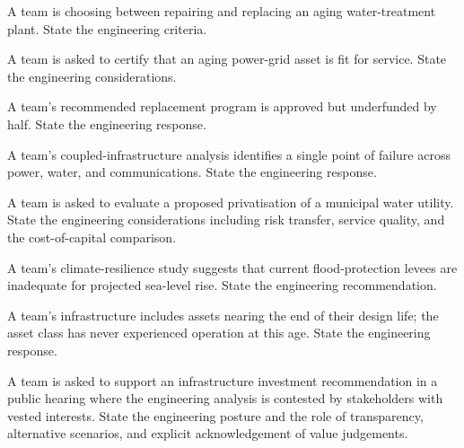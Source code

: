 \begin{exercise}
A team is choosing between repairing and replacing an aging water-treatment plant. State the engineering criteria.
\end{exercise}

\begin{exercise}
A team is asked to certify that an aging power-grid asset is fit for service. State the engineering considerations.
\end{exercise}

\begin{exercise}
A team's recommended replacement program is approved but underfunded by half. State the engineering response.
\end{exercise}

\begin{exercise}
A team's coupled-infrastructure analysis identifies a single point of failure across power, water, and communications. State the engineering response.
\end{exercise}

\begin{exercise}
A team is asked to evaluate a proposed privatisation of a municipal water utility. State the engineering considerations including risk transfer, service quality, and the cost-of-capital comparison.
\end{exercise}

\begin{exercise}
A team's climate-resilience study suggests that current flood-protection levees are inadequate for projected sea-level rise. State the engineering recommendation.
\end{exercise}

\begin{exercise}
A team's infrastructure includes assets nearing the end of their design life; the asset class has never experienced operation at this age. State the engineering response.
\end{exercise}

\begin{exercise}
A team is asked to support an infrastructure investment recommendation in a public hearing where the engineering analysis is contested by stakeholders with vested interests. State the engineering posture and the role of transparency, alternative scenarios, and explicit acknowledgement of value judgements.
\end{exercise}
